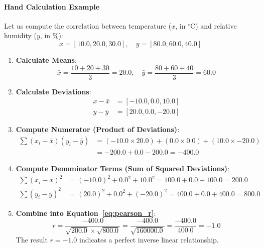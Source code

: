 \paragraph{Hand Calculation Example}
Let us compute the correlation between temperature ($x$, in $^\circ\text{C}$) and relative humidity ($y$, in $\%$):
\begin{equation*}
x = [10.0, 20.0, 30.0], \quad y = [80.0, 60.0, 40.0]
\end{equation*}
\begin{enumerate}
    \item \textbf{Calculate Means}:
    \begin{equation*}
    \bar{x} = \frac{10 + 20 + 30}{3} = 20.0, \quad \bar{y} = \frac{80 + 60 + 40}{3} = 60.0
    \end{equation*}
    \item \textbf{Calculate Deviations}:
    \begin{align*}
    x - \bar{x} &= [-10.0, 0.0, 10.0] \\
    y - \bar{y} &= [20.0, 0.0, -20.0]
    \end{align*}
    \item \textbf{Compute Numerator (Product of Deviations)}:
    \begin{align*}
    \sum (x_i - \bar{x})(y_i - \bar{y}) &= (-10.0 \times 20.0) + (0.0 \times 0.0) + (10.0 \times -20.0) \\
    &= -200.0 + 0.0 - 200.0 = -400.0
    \end{align*}
    \item \textbf{Compute Denominator Terms (Sum of Squared Deviations)}:
    \begin{align*}
    \sum (x_i - \bar{x})^2 &= (-10.0)^2 + 0.0^2 + 10.0^2 = 100.0 + 0.0 + 100.0 = 200.0 \\
    \sum (y_i - \bar{y})^2 &= (20.0)^2 + 0.0^2 + (-20.0)^2 = 400.0 + 0.0 + 400.0 = 800.0
    \end{align*}
    \item \textbf{Combine into Equation~\ref{eq:pearson_r}}:
    \begin{equation*}
    r = \frac{-400.0}{\sqrt{200.0} \times \sqrt{800.0}} = \frac{-400.0}{\sqrt{160000.0}} = \frac{-400.0}{400.0} = -1.0
    \end{equation*}
    The result $r = -1.0$ indicates a perfect inverse linear relationship.
\end{enumerate}

